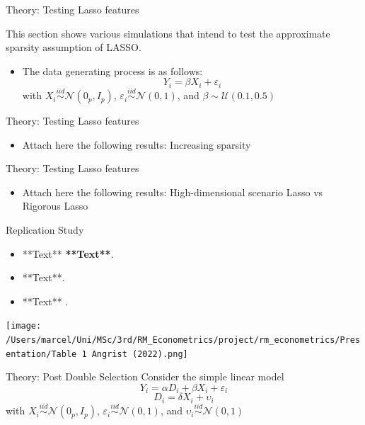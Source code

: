 \documentclass{beamer}
\begin{document}
\begin{frame}{Theory: Testing Lasso features}
\begin{flushleft}
This section shows various simulations that intend to test the approximate sparsity assumption of LASSO.
\end{flushleft}
	\begin{itemize}
		\item The data generating process is as follows:
		\[Y_i = \beta X_i + \varepsilon_i\]
		with \(X_i \stackrel{iid}{\sim} \mathcal{N}(0_p,I_p)\), \(\varepsilon_i \stackrel{iid}{\sim} \mathcal{N}(0,1)\), and \(\beta  {\sim}  \mathcal{U}(0.1,0.5)\) 
	\end{itemize}
\end{frame}


\begin{frame}{Theory: Testing Lasso features}
	\begin{itemize}
		\item Attach here the following results: Increasing sparsity
	\end{itemize}
\end{frame}



\begin{frame}{Theory: Testing Lasso features}
	\begin{itemize}
		\item Attach here the following results: High-dimensional scenario Lasso vs Rigorous Lasso
	\end{itemize}
\end{frame}


\begin{frame}{Replication Study}
\begin{itemize}
  
\item **Text** \textbf{**Text**}.
\item **Text**. 
\item **Text** .
\end{itemize}

\texttt{[image: /Users/marcel/Uni/MSc/3rd/RM\_Econometrics/project/rm\_econometrics/Presentation/Table 1 Angrist (2022).png]}
\end{frame}

\begin{frame}{Theory: Post Double Selection}
Consider the simple linear model
\[Y_i = \alpha D_i + \beta X_i + \varepsilon_i\]
\[D_i = \delta X_i + \upsilon_i\]
with \(X_i \stackrel{iid}{\sim} \mathcal{N}(0_p,I_p)\), \(\varepsilon_i \stackrel{iid}{\sim} \mathcal{N}(0,1)\), and \(\upsilon_i \stackrel{iid}{\sim} \mathcal{N}(0,1)\) 
\end{frame}
\end{document}

